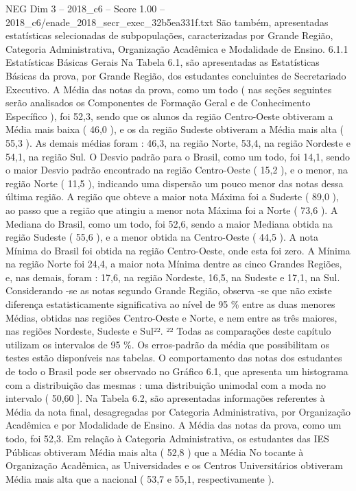 \begin{textsample}{NEG Dim 3 – 2018\_c6 – Score 1.00 – 2018\_c6/enade\_2018\_secr\_exec\_32b5ea331f.txt}
São também, apresentadas estatísticas selecionadas de subpopulações, caracterizadas por Grande Região, Categoria Administrativa, Organização Acadêmica e Modalidade de Ensino. 6.1.1 Estatísticas Básicas Gerais Na Tabela 6.1, são apresentadas as Estatísticas Básicas da prova, por Grande Região, dos estudantes concluintes de Secretariado Executivo.
A Média das notas da prova, como um todo ( nas seções seguintes serão analisados os Componentes de Formação Geral e de Conhecimento Específico ), foi 52,3, sendo que os alunos da região Centro-Oeste obtiveram a Média mais baixa ( 46,0 ), e os da região Sudeste obtiveram a Média mais alta ( 55,3 ).
As demais médias foram : 46,3, na região Norte, 53,4, na região Nordeste e 54,1, na região Sul.
O Desvio padrão para o Brasil, como um todo, foi 14,1, sendo o maior Desvio padrão encontrado na região Centro-Oeste ( 15,2 ), e o menor, na região Norte ( 11,5 ), indicando uma dispersão um pouco menor das notas dessa última região.
A região que obteve a maior nota Máxima foi a Sudeste ( 89,0 ), ao passo que a região que atingiu a menor nota Máxima foi a Norte ( 73,6 ).
A Mediana do Brasil, como um todo, foi 52,6, sendo a maior Mediana obtida na região Sudeste ( 55,6 ), e a menor obtida na Centro-Oeste ( 44,5 ).
A nota Mínima do Brasil foi obtida na região Centro-Oeste, onde esta foi zero.
A Mínima na região Norte foi 24,4, a maior nota Mínima dentre as cinco Grandes Regiões, e, nas demais, foram : 17,6, na região Nordeste, 16,5, na Sudeste e 17,1, na Sul.
Considerando -se as notas segundo Grande Região, observa -se que não existe diferença estatisticamente significativa ao nível de 95 \% entre as duas menores Médias, obtidas nas regiões Centro-Oeste e Norte, e nem entre as três maiores, nas regiões Nordeste, Sudeste e Sul²². ²² Todas as comparações deste capítulo utilizam os intervalos de 95 \%.
Os erros-padrão da média que possibilitam os testes estão disponíveis nas tabelas.
O comportamento das notas dos estudantes de todo o Brasil pode ser observado no Gráfico 6.1, que apresenta um histograma com a distribuição das mesmas : uma distribuição unimodal com a moda no intervalo ( 50,60 ].
Na Tabela 6.2, são apresentadas informações referentes à Média da nota final, desagregadas por Categoria Administrativa, por Organização Acadêmica e por Modalidade de Ensino.
A Média das notas da prova, como um todo, foi 52,3.
Em relação à Categoria Administrativa, os estudantes das IES Públicas obtiveram Média mais alta ( 52,8 ) que a Média No tocante à Organização Acadêmica, as Universidades e os Centros Universitários obtiveram Média mais alta que a nacional ( 53,7 e 55,1, respectivamente ).

\end{textsample}
